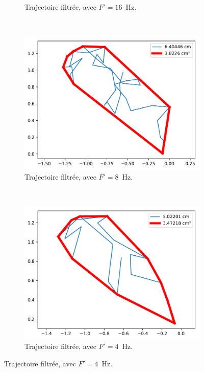 \begin{figure}[htbp]
\begin{subfigure}[t]{0.49\textwidth}
			\caption{Trajectoire filtrée, avec $F' = 16$~Hz.}
			\label{fig:filterFw16}
		\end{subfigure}
		~
		\begin{subfigure}[t]{0.49\textwidth}
			\centering
			\includegraphics[width=\textwidth]{figures/ch5/2_19_freqFilter_2_19_120_32_filter_8}
			\caption{Trajectoire filtrée, avec $F' = 8$~Hz.}
			\label{fig:filterFw8}
		\end{subfigure}		
		~
		\begin{subfigure}[t]{0.49\textwidth}
			\centering
			\includegraphics[width=\textwidth]{figures/ch5/2_19_freqFilter_2_19_120_32_filter_4}
			\caption{Trajectoire filtrée, avec $F' = 4$~Hz.}
			\label{fig:filterFw4}
		\end{subfigure}

\end{figure}
